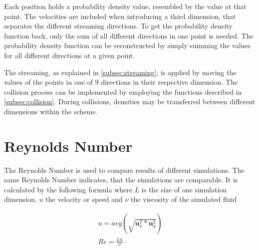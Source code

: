 Each position holds a probability density value, resembled by the value at that point.
The velocities are included when introducing a third dimension, that separates the different streaming directions.
To get the probability density function back, only the sum of all different directions in one point is needed.
The probability density function can be reconstructed by simply summing the values for all different directions at a given point.
\newline

The streaming, as explained in \cref{subsec:streaming}, is applied by moving the values of the points in one of 9 directions in their respective dimension.
The collision process can be implemented by employing the functions described in \cref{subsec:collision}.
During collisions, densities may be transferred between different dimensions within the scheme.


\section{Reynolds Number}\label{sec:reynolds-number}
The Reynolds Number is used to compare results of different simulations.
The same Reynolds Number indicates, that the simulations are comparable.
It is calculated by the following formula where $L$ is the size of one simulation dimension, $u$ the velocity or speed and $\nu$ the viscosity of the simulated fluid

\begin{equation*}
    \begin{gathered}
        u = avg(\sqrt{\mathbf u_x^2 * \mathbf u_y^2}) \\
        Re = \frac{L u}{\nu} \cdot
    \end{gathered}
\end{equation*}

